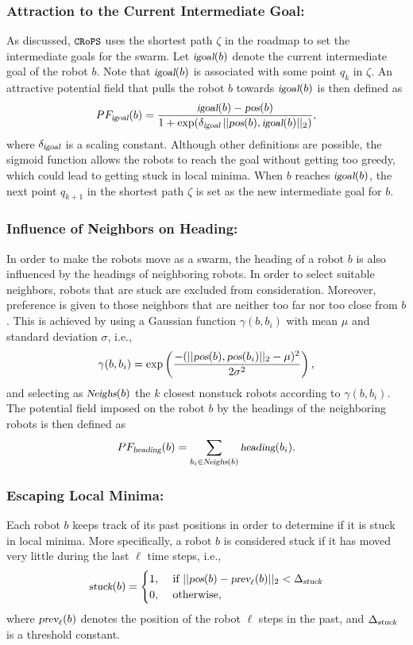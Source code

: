 \documentclass{llncs}
\newcommand{\Acronym}[1]{\ensuremath{{\small{\texttt{#1}}}}}
\newcommand{\Var}[1]{\ensuremath{{\small{\textsl{#1}}}}}
\newcommand{\Name}{\Acronym{CRoPS}}
\begin{document}
\subsubsection{Attraction to the Current Intermediate Goal:}
\label{sec:PFigoal} As
discussed, $\Name$ uses the shortest path $\zeta$ in the roadmap to
set the intermediate goals for the swarm. Let $\Var{igoal}(b)$ denote
the current intermediate goal of the robot $b$. Note that
$\Var{igoal}(b)$ is associated with some point $q_k$ in $\zeta$. An
attractive potential field that
pulls the robot $b$ towards $\Var{igoal}(b)$ is then defined as 
$$
PF_\Var{igoal}(b) = \frac{\Var{igoal}(b) - \Var{pos}(b)}{1 +
  \exp(\delta_\Var{igoal}\, ||\Var{pos}(b), \Var{igoal}(b)||_2)},
$$ where $\delta_\Var{igoal}$ is a scaling constant. Although other
definitions are possible, the sigmoid function allows the robots to
reach the goal without getting too greedy, which could lead to getting
stuck in local minima. When $b$ reaches $\Var{igoal}(b)$, the next
point $q_{k+1}$ in the shortest path $\zeta$ is set as the new
intermediate goal for $b$.

\subsubsection{Influence of Neighbors on Heading:}
\label{sec:PFheading}
 In order to make
the robots move as a swarm, the heading of a robot $b$ is also
influenced by the headings of neighboring robots. In order to select
suitable neighbors, robots that are stuck
are excluded from consideration. Moreover, preference is given to those
neighbors that are neither too far nor too close from $b$. This is
achieved by using a Gaussian function $\gamma(b, b_i)$ with mean $\mu$ and standard
deviation $\sigma$, i.e.,
$$
\gamma(b, b_i) = \exp\left(\frac{-(||\Var{pos}(b), \Var{pos}(b_i)||_2 - \mu)^2}
{2\sigma^2}\right),
$$
and selecting as $\Var{Neighs}(b)$ the $k$ closest nonstuck robots
according to $\gamma(b, b_i)$.
The potential
field imposed on the robot $b$ by the headings of the neighboring robots
is then defined as
$$
PF_\Var{heading}(b) = \sum_{b_i \in
    \Var{Neighs}(b)} \Var{heading}(b_i).
$$




\subsubsection{Escaping Local Minima:}
\label{sec:PFrand}
Each robot $b$ keeps track of its past positions in order to determine
if it is stuck in local minima. More specifically, a robot $b$ is
considered stuck if it has moved very little during the last $\ell$
time steps, i.e.,
$$
\Var{stuck}(b) = 
\begin{cases}
1, & \mbox{ if } ||\Var{pos}(b) - \Var{prev}_{\ell}(b)||_2 <
\Delta_\Var{stuck}\\
0, & \mbox{ otherwise,}
\end{cases}
$$
 where $\Var{prev}_{\ell}(b)$ denotes the position of the robot 
 $\ell$ steps in the past,  and $\Delta_\Var{stuck}$ is a
 threshold constant.
\end{document}
